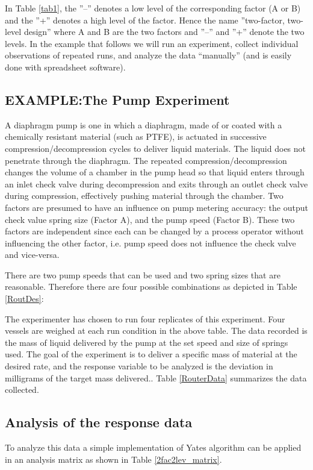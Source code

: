 In Table \ref{tab1}, the ''--'' denotes a low level of the corresponding factor (A or B) and the ''+'' denotes a high level of the factor.  Hence the name ''two-factor, two-level design'' where A and B are the two factors and ''--'' and ''+'' denote the two levels. In the example that follows we will run an experiment, collect individual observations of repeated runs, and analyze the data ``manually'' (and is easily done with spreadsheet software).

\subsection{EXAMPLE:The Pump Experiment} 
\label{router}
A diaphragm pump is one in which a diaphragm, made of or coated with a chemically resistant material (such as PTFE), is actuated in successive compression/decompression cycles to deliver liquid materials. The liquid does not penetrate through the diaphragm. The repeated compression/decompression changes the volume of a chamber in the pump head so that liquid enters through an inlet check valve during decompression and exits through an outlet check valve during compression, effectively pushing material through the chamber.   Two factors are presumed to have an influence on pump metering accuracy: the output check value spring size (Factor A), and  the pump speed (Factor B). These two factors are independent since each can be changed by a process operator without influencing the other factor, i.e. pump speed does not influence the check valve and vice-versa.

There are two pump speeds that can be used and two spring sizes that are reasonable.  Therefore there are four possible combinations as depicted in Table \ref{RoutDes}:



The experimenter has chosen to run four replicates of this experiment.  Four vessels are weighed at each run condition in the above table.  The data recorded is the mass of liquid delivered by the pump at the set speed and size of springs used. The goal of the experiment is to deliver a specific mass of material at the desired rate, and the response variable to be analyzed is the deviation in milligrams of the target mass delivered.. Table \ref{RouterData} summarizes the data collected.




\subsection{Analysis of the response data}
To analyze this data a simple implementation of Yates algorithm can be applied in an analysis matrix as shown in Table \ref{2fac2lev_matrix}.

